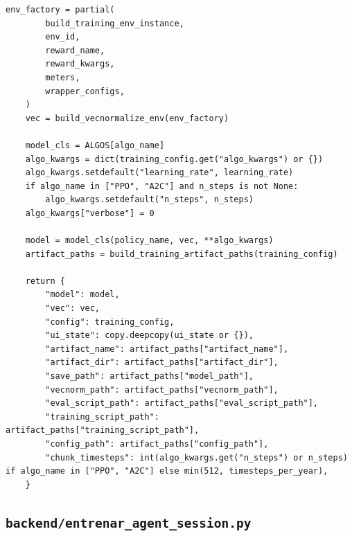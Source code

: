 \documentclass[10pt,a4paper]{article}
\begin{document}
\begin{lstlisting}[style=studioPython,caption={backend/entrenar\_agent\_runtime.py},label={lst:backend-entrenar-agent-runtime-py}]
    env_factory = partial(
        build_training_env_instance,
        env_id,
        reward_name,
        reward_kwargs,
        meters,
        wrapper_configs,
    )
    vec = build_vecnormalize_env(env_factory)

    model_cls = ALGOS[algo_name]
    algo_kwargs = dict(training_config.get("algo_kwargs") or {})
    algo_kwargs.setdefault("learning_rate", learning_rate)
    if algo_name in ["PPO", "A2C"] and n_steps is not None:
        algo_kwargs.setdefault("n_steps", n_steps)
    algo_kwargs["verbose"] = 0

    model = model_cls(policy_name, vec, **algo_kwargs)
    artifact_paths = build_training_artifact_paths(training_config)

    return {
        "model": model,
        "vec": vec,
        "config": training_config,
        "ui_state": copy.deepcopy(ui_state or {}),
        "artifact_name": artifact_paths["artifact_name"],
        "artifact_dir": artifact_paths["artifact_dir"],
        "save_path": artifact_paths["model_path"],
        "vecnorm_path": artifact_paths["vecnorm_path"],
        "eval_script_path": artifact_paths["eval_script_path"],
        "training_script_path": artifact_paths["training_script_path"],
        "config_path": artifact_paths["config_path"],
        "chunk_timesteps": int(algo_kwargs.get("n_steps") or n_steps) if algo_name in ["PPO", "A2C"] else min(512, timesteps_per_year),
    }
\end{lstlisting}


\subsection{\texorpdfstring{\texttt{backend/entrenar\_agent\_session.py}}{backend/entrenar\_agent\_session.py}}
\end{document}
